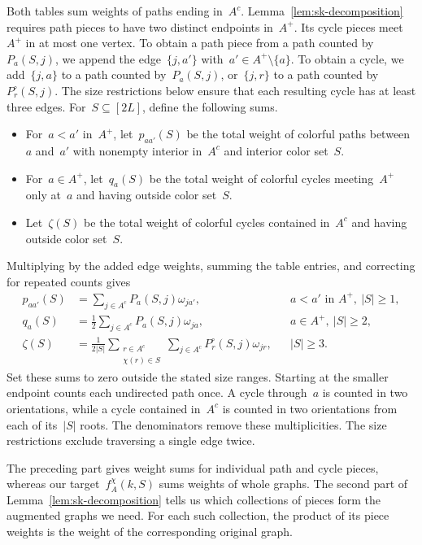 \documentclass[letterpaper,11pt,reqno]{amsart}
\makeatletter
\renewcommand{\geq}{\geqslant}
\renewcommand{\paragraph}[1]{\if@noskipsec\leavevmode\fi\par\addvspace{.5\baselineskip plus .2\baselineskip}\noindent{\normalfont\bfseries #1}\hspace{.5em}\ignorespaces}
\makeatother
\begin{document}
Both tables sum weights of paths ending in~$A^c$. Lemma~\ref{lem:sk-decomposition} requires path pieces to have two distinct endpoints in~$A^+$. Its cycle pieces meet~$A^+$ in at most one vertex. To obtain a path piece from a path counted by~$P_a(S,j)$, we append the edge~$\{j,a'\}$ with~$a'\in A^+\setminus\{a\}$. To obtain a cycle, we add~$\{j,a\}$ to a path counted by~$P_a(S,j)$, or~$\{j,r\}$ to a path counted by~$P_r^\circ(S,j)$. The size restrictions below ensure that each resulting cycle has at least three edges. For~$S\subseteq[2L]$, define the following sums.
\begin{itemize}
\item For~$a<a'$ in~$A^+$, let~$p_{aa'}(S)$ be the total weight of colorful paths between~$a$ and~$a'$ with nonempty interior in~$A^c$ and interior color set~$S$.
\item For~$a\in A^+$, let~$q_a(S)$ be the total weight of colorful cycles meeting~$A^+$ only at~$a$ and having outside color set~$S$.
\item Let~$\zeta(S)$ be the total weight of colorful cycles contained in~$A^c$ and having outside color set~$S$.
\end{itemize}
Multiplying by the added edge weights, summing the table entries, and correcting for repeated counts gives
\begin{align}
p_{aa'}(S)&=\sum_{j\in A^c}P_a(S,j)\omega_{ja'},&&a<a'\text{ in }A^+,\ |S|\geq1,\label{eq:sk-path-close}\\
q_a(S)&=\frac12\sum_{j\in A^c}P_a(S,j)\omega_{ja},&&a\in A^+,\ |S|\geq2,\label{eq:sk-return-close}\\
\zeta(S)&=\frac1{2|S|}\sum_{\substack{r\in A^c\\\chi(r)\in S}}\sum_{j\in A^c}P_r^\circ(S,j)\omega_{jr},&&|S|\geq3.\label{eq:sk-cycle-close}
\end{align}
Set these sums to zero outside the stated size ranges. Starting at the smaller endpoint counts each undirected path once. A cycle through~$a$ is counted in two orientations, while a cycle contained in~$A^c$ is counted in two orientations from each of its~$|S|$ roots. The denominators remove these multiplicities. The size restrictions exclude traversing a single edge twice.

\paragraph{Combining the pieces.}
The preceding part gives weight sums for individual path and cycle pieces, whereas our target~$f_A^\chi(k,S)$ sums weights of whole graphs. The second part of Lemma~\ref{lem:sk-decomposition} tells us which collections of pieces form the augmented graphs we need. For each such collection, the product of its piece weights is the weight of the corresponding original graph.
\end{document}
